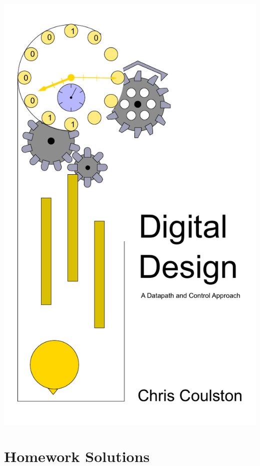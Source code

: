 \documentclass[letterpaper, 10pt]{memoir}
\begin{document}
\frontmatter
\title{}
\includegraphics{./Fig/colorCover}
\maketitle


\tableofcontents
\showanswers

\mainmatter
\chapter*{Homework Solutions}

% 
\end{document}
